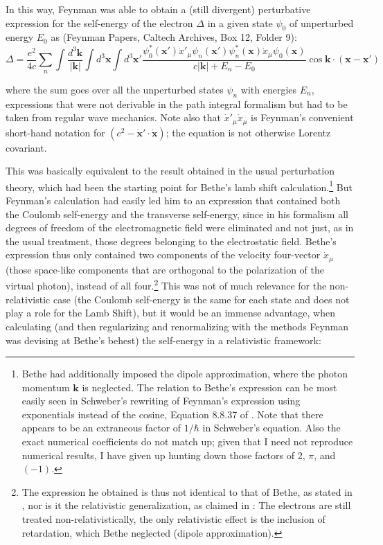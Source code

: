 \documentclass[12pt,a4paper]{article}
\begin{document}
In this way, Feynman was able to obtain a (still divergent) perturbative expression for the self-energy of the electron $\Delta$ in a given state $\psi_0$ of unperturbed energy $E_0$ as (Feynman Papers, Caltech Archives, Box 12, Folder 9):\\

\begin{equation}
\Delta = \frac{e^2}{4 c} \sum_n \int \frac{d^3 \mathbf{k}}{\left\vert \mathbf{k} \right\vert} \int d^3 \mathbf{x} \int d^3 \mathbf{x}' \frac{\psi^{\ast}_0 (\mathbf{x}') \dot{x}'_{\mu} \psi_n (\mathbf{x}') \psi^{\ast}_n (\mathbf{x}) \dot{x}_{\mu} \psi_0 (\mathbf{x})}{c \left\vert \mathbf{k} \right\vert + E_n - E_0} \cos{\mathbf{k} \cdot (\mathbf{x}-\mathbf{x}')}
\end{equation}

where the sum goes over all the unperturbed states $\psi_n$ with energies $E_n$, expressions that were not derivable in the path integral formalism but had to be taken from regular wave mechanics. Note also that $\dot{x}'_{\mu} \dot{x}_{\mu}$ is Feynman's convenient short-hand notation for $\left( c^2 - \dot{\mathbf{x}}' \cdot \dot{\mathbf{x}} \right)$; the equation is not otherwise Lorentz covariant.

This was basically equivalent to the result obtained in the usual perturbation theory, which had been the starting point for Bethe's lamb shift calculation.\footnote{Bethe had additionally imposed the dipole approximation, where the photon momentum $\mathbf{k}$ is neglected. The relation to Bethe's expression can be most easily seen in Schweber's rewriting of Feynman's expression using exponentials instead of the cosine, Equation 8.8.37 of \citep{schweber_1994_qed}. Note that there appears to be an extraneous factor of $1/\hbar$ in Schweber's equation. Also the exact numerical coefficients do not match up; given that I need not reproduce numerical results, I have given up hunting down those factors of 2, $\pi$, and $(-1)$.} But Feynman's calculation had easily led him to an expression that contained both the Coulomb self-energy and the transverse self-energy, since in his formalism all degrees of freedom of the electromagnetic field were eliminated and not just, as in the usual treatment, those degrees belonging to the electrostatic field. Bethe's expression thus only contained two components of the velocity four-vector $\dot{x}_{\mu}$ (those space-like components that are orthogonal to the polarization of the virtual photon), instead of all four.\footnote{The expression he obtained is thus not identical to that of Bethe, as stated in \citep[p.422]{schweber_1994_qed}, nor is it the relativistic generalization, as claimed in \citep[p.  233]{mehra_1994_the-beat}: The electrons are still treated non-relativistically, the only relativistic effect is the inclusion of retardation, which Bethe neglected (dipole approximation).} This was not of much relevance for the non-relativistic case (the Coulomb self-energy is the same for each state and does not play a role for the Lamb Shift), but it would be an immense advantage, when calculating (and then regularizing and renormalizing with the methods Feynman was devising at Bethe's behest) the self-energy in a relativistic framework:
\end{document}
